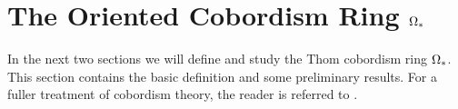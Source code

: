 \documentclass[../main]{subfiles}
\begin{document}
\chapter{The Oriented Cobordism Ring \texorpdfstring{$\Omega_\ast$}{omega*}}\label{ch:17}
In the next two sections we will define and study the Thom cobordism ring $\Omega_\ast$. This section contains the basic definition and some preliminary results. For a fuller treatment of cobordism theory, the reader is referred to \cite{stongcobordism1968}.



\end{document}
